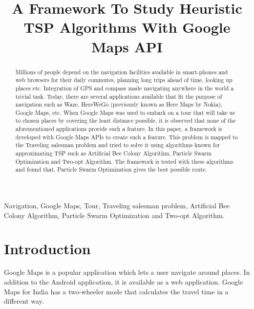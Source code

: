 \documentclass[conference]{IEEEtran}
\begin{document}
\renewcommand\IEEEkeywordsname{Keywords:}

\title{A Framework To Study Heuristic TSP Algorithms With Google Maps API}

\author{
}
\maketitle

\begin{abstract}
Millions of people depend on the navigation facilities available in smart-phones and web browsers for their daily commutes, planning long trips ahead of time, looking up places etc. Integration of GPS and compass made navigating anywhere in the world a trivial task. Today, there are several applications available that fit the purpose of navigation such as Waze, HereWeGo (previously known as Here Maps by Nokia), Google Maps, etc. When Google Maps was used to embark on a tour that will take us to chosen places by covering the least distance possible, it is observed that none of the aforementioned applications provide such a feature. In this paper, a framework is developed with Google Maps APIs to create such a feature. This problem is mapped to the Traveling salesman problem and tried to solve it using algorithms known for approximating TSP such as Artificial Bee Colony Algorithm, Particle Swarm Optimization and Two-opt Algorithm. The framework is tested with these algorithms and found that, Particle Swarm Optimization gives the best possible route.

\end{abstract}

\begin{IEEEkeywords}
Navigation, Google Maps, Tour, Traveling salesman problem, Artificial Bee Colony Algorithm, Particle Swarm Optimization and Two-opt Algorithm.
\end{IEEEkeywords}

\section{Introduction}
Google Maps is a popular application which lets a user navigate around places. In addition to the Android application, it is available as a web application. Google Maps for India has a two-wheeler mode that calculates the travel time in a different way. 
\end{document}
